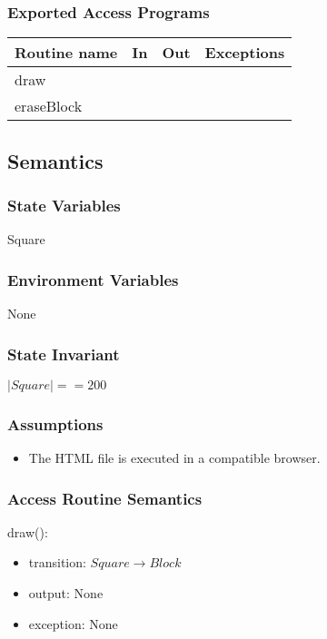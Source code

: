 \documentclass[12pt]{article}
\begin{document}
\subsubsection* {Exported Access Programs}

\begin{tabular}{| l | l | l | l |}
\hline
\textbf{Routine name} & \textbf{In} & \textbf{Out} & \textbf{Exceptions}\\
\hline
draw &  &  &  \\
\hline
eraseBlock & & & \\
\hline
\end{tabular}

\subsection* {Semantics}

\subsubsection* {State Variables}

Square


\subsubsection* {Environment Variables}
None
\subsubsection* {State Invariant}
$|Square| == 200 $

\subsubsection* {Assumptions}

\begin{itemize}
    \item The HTML file is executed in a compatible browser.
\end{itemize}


\subsubsection* {Access Routine Semantics}

\noindent draw():
\begin{itemize}
\item transition: $Square \rightarrow Block$
\item output: None
\item exception: None
\end{itemize}
\end{document}
